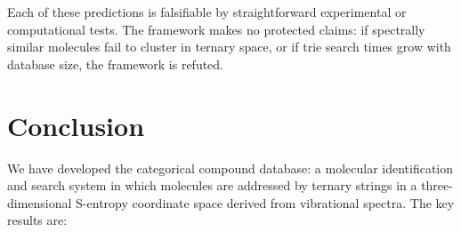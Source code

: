 \documentclass[11pt,twocolumn,a4paper]{article}
\theoremstyle{definition}
\theoremstyle{remark}
\begin{document}
Each of these predictions is falsifiable by straightforward experimental or computational tests. The framework makes no protected claims: if spectrally similar molecules fail to cluster in ternary space, or if trie search times grow with database size, the framework is refuted.

\section{Conclusion}
\label{sec:conclusion}

We have developed the categorical compound database: a molecular identification and search system in which molecules are addressed by ternary strings in a three-dimensional S-entropy coordinate space derived from vibrational spectra. The key results are:
\end{document}
